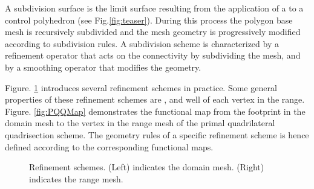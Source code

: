 
A subdivision surface is the limit surface resulting from the
application of a  to a control polyhedron
(see Fig.\ref{fig:teaser}). During this process the polygon base
mesh is recursively subdivided and the mesh geometry is progressively
modified according to subdivision rules. A subdivision scheme is
characterized by a refinement operator that acts on the connectivity
by subdividing the mesh, and by a smoothing operator that modifies the
geometry. 

Figure. \ref{fig:RefSchemes} introduces several refinement schemes in
practice. Some general properties of these refinement schemes are
,  and well
 of each vertex in the
range. Figure. \ref{fig:PQQMap} demonstrates the functional map from
the footprint in the domain mesh to the vertex in the range mesh of
the primal quadrilateral quadrisection scheme. The geometry rules of a
specific refinement scheme is hence defined according to the
corresponding functional maps.

\begin{figure}
  \centering
  \caption{Refinement schemes. (Left) indicates the domain mesh.
  (Right) indicates the range mesh. }
  \label{fig:RefSchemes}
\end{figure}

